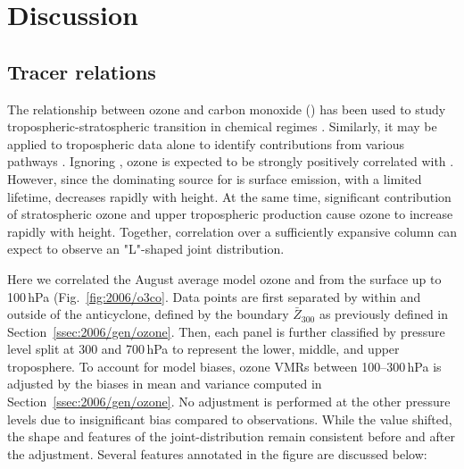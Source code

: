 \ifpdf
    \graphicspath{{Chapter_2006/figures/PNG/}{Chapter_2006/figures/PDF/}{Chapter_2006/figures/}}
\else
    \graphicspath{{Chapter_2006/figures/EPS/}{Chapter_2006/figures/}}
\fi

\section{Discussion}\label{sec:2006/discussion}

\subsection{Tracer relations}\label{ssec:2006/discuss/tracer}

The relationship between ozone and carbon monoxide () has been used to study tropospheric-stratospheric transition in
chemical regimes \citep[e.g.][and references therein]{Pan:2007sw,Hegglin:2009fk}. Similarly, it may be applied to tropospheric data
alone to identify contributions from various pathways \citep[e.g.][]{Zhang:2006zr,Voulgarakis:2011fk,Cristofanelli:2013uq}. Ignoring
, ozone is expected to be strongly positively correlated with  \citep{Chin:1994kx}. However, since the dominating
source for  is surface emission, with a limited lifetime,  decreases rapidly with height. At the same time, significant
contribution of stratospheric ozone and upper tropospheric production cause ozone to increase rapidly with height. Together, 
correlation over a sufficiently expansive column can expect to observe an "L"-shaped joint distribution.


Here we correlated the August average model ozone and  from the surface up to 100\,\unit{hPa} (Fig.~\ref{fig:2006/o3co}.
Data points are first separated by within and outside of the anticyclone, defined by the boundary $\bar{Z}_{300}$ as previously
defined in Section~\ref{ssec:2006/gen/ozone}. Then, each panel is further classified by pressure level split at 300 and 700\,\unit{hPa}
to represent the lower, middle, and upper troposphere. To account for model biases, ozone VMRs between 100--300\,\unit{hPa}
is adjusted by the biases in mean and variance computed in Section~\ref{ssec:2006/gen/ozone}. No adjustment is performed at
the other pressure levels due to insignificant bias compared to observations. While the value shifted, the shape and features of the
joint-distribution remain consistent before and after the adjustment. Several features annotated in the figure are discussed below:

